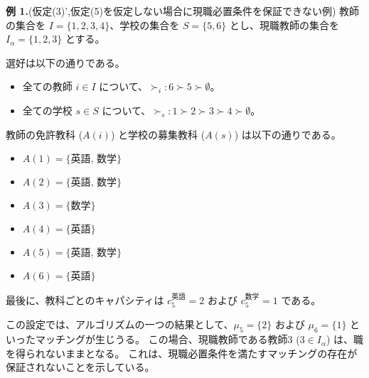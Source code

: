 \documentclass[12pt, a4paper]{article}
\theoremstyle{definition}
\theoremstyle{remark}
\theoremstyle{plain}
\begin{document}




\textbf{例 1.}(仮定(3)',仮定(5)を仮定しない場合に現職必置条件を保証できない例)
教師の集合を $I = \{1,2,3,4\}$、学校の集合を $S = \{5,6\}$ とし、現職教師の集合を $I_\alpha = \{1,2,3\}$ とする。

選好は以下の通りである。
\begin{itemize}
    \item 全ての教師 $i \in I$ について、$\succ_i: 6 \succ 5 \succ \emptyset$。
    \item 全ての学校 $s \in S$ について、$\succ_s: 1 \succ 2 \succ 3 \succ 4 \succ \emptyset$。
\end{itemize}

教師の免許教科 ($A(i)$) と学校の募集教科 ($A(s)$) は以下の通りである。
\begin{itemize}
    \item $A(1) = \{\text{英語, 数学}\}$
    \item $A(2) = \{\text{英語, 数学}\}$
    \item $A(3) = \{\text{数学}\}$
    \item $A(4) = \{\text{英語}\}$
    \item $A(5) = \{\text{英語, 数学}\}$
    \item $A(6) = \{\text{英語}\}$
\end{itemize}

最後に、教科ごとのキャパシティは $c_5^{\text{英語}} = 2$ および $c_5^{\text{数学}} = 1$ である。

この設定では、アルゴリズムの一つの結果として、$\mu_5 = \{2\}$ および $\mu_6 = \{1\}$ といったマッチングが生じうる。
この場合、現職教師である教師3 ($3 \in I_\alpha$) は、職を得られないままとなる。
これは、現職必置条件を満たすマッチングの存在が保証されないことを示している。




\end{document}
